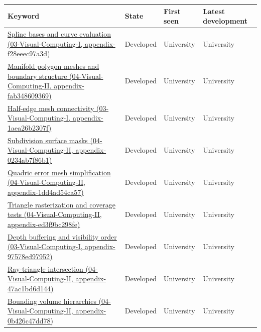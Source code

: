{\def\LTcaptype{none} %
\begin{longtable}[]{@{}
  >{\raggedright\arraybackslash}p{}
  >{\raggedright\arraybackslash}p{}
  >{\raggedright\arraybackslash}p{}
  >{\raggedright\arraybackslash}p{}@{}}
\toprule\noalign{}
\begin{minipage}[b]{\linewidth}\raggedright
Keyword
\end{minipage} & \begin{minipage}[b]{\linewidth}\raggedright
State
\end{minipage} & \begin{minipage}[b]{\linewidth}\raggedright
First seen
\end{minipage} & \begin{minipage}[b]{\linewidth}\raggedright
Latest development
\end{minipage} \\
\midrule\noalign{}
\endhead
\bottomrule\noalign{}
\endlastfoot
\href{}{Spline bases and curve evaluation (03-Visual-Computing-I, appendix-f28eeec97a3d)} & Developed & University & University \\
\href{}{Manifold polygon meshes and boundary structure (04-Visual-Computing-II, appendix-fab348609369)} & Developed & University & University \\
\href{}{Half-edge mesh connectivity (03-Visual-Computing-I, appendix-1aea26b2307f)} & Developed & University & University \\
\href{}{Subdivision surface masks (04-Visual-Computing-II, appendix-0234ab7f86b1)} & Developed & University & University \\
\href{}{Quadric error mesh simplification (04-Visual-Computing-II, appendix-1dd4ad54ca57)} & Developed & University & University \\
\href{}{Triangle rasterization and coverage tests (04-Visual-Computing-II, appendix-ed3f9bc298fe)} & Developed & University & University \\
\href{}{Depth buffering and visibility order (03-Visual-Computing-I, appendix-97578ed97952)} & Developed & University & University \\
\href{}{Ray-triangle intersection (04-Visual-Computing-II, appendix-47ac1bd6d144)} & Developed & University & University \\
\href{}{Bounding volume hierarchies (04-Visual-Computing-II, appendix-0b426c47dd78)} & Developed & University & University \\

\end{longtable}}
